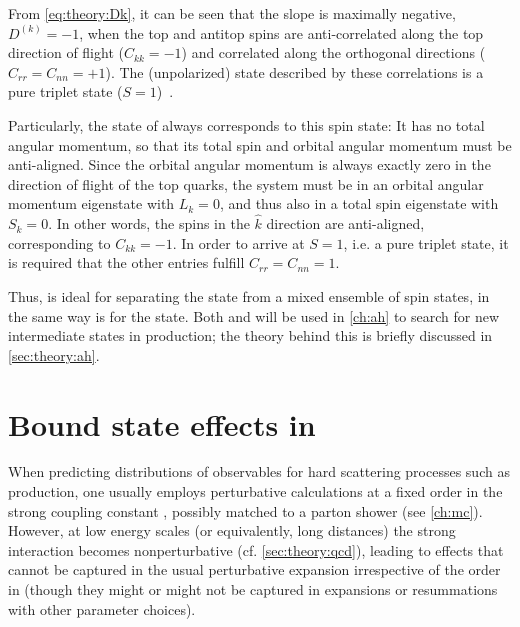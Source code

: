 From \cref{eq:theory:Dk}, it can be seen that the slope is maximally negative, $D^{(k)} = -1$, when the top and antitop spins are anti-correlated along the top direction of flight ($C_{kk} = -1$) and correlated along the orthogonal directions ($C_{rr} = C_{nn} = +1$). The (unpolarized) state described by these correlations is a pure triplet state ($S=1$)~\cite{Maltoni:2024tul}. 

Particularly, the  state of \ttbar always corresponds to this spin state: It has no total angular momentum, so that its total spin and orbital angular momentum must be anti-aligned. Since the orbital angular momentum is always exactly zero in the direction of flight of the top quarks, the \ttbar system must be in an orbital angular momentum eigenstate with $L_k = 0$, and thus also in a total spin eigenstate with $S_k = 0$. In other words, the spins in the $\hat{k}$ direction are anti-aligned, corresponding to $C_{kk} = -1$. In order to arrive at $S=1$, i.e. a pure triplet state, it is required that the other entries fulfill $C_{rr} = C_{nn} = 1$.

Thus, \chan is ideal for separating the  state from a mixed ensemble of \ttbar spin states, in the same way \chel is for the  state. Both \chel and \chan will be used in \cref{ch:ah} to search for new intermediate states in \ttbar production; the theory behind this is briefly discussed in \cref{sec:theory:ah}.



\section{Bound state effects in \ttbartitle}
\label{sec:theory:etat}

When predicting distributions of observables for hard scattering processes such as \ttbar production, one usually employs perturbative calculations at a fixed order in the strong coupling constant \alphas, possibly matched to a parton shower (see \cref{ch:mc}). However, at low energy scales (or equivalently, long distances) the strong interaction becomes nonperturbative (cf. \cref{sec:theory:qcd}), leading to effects that cannot be captured in the usual perturbative expansion irrespective of the order in \alphas (though they might or might not be captured in expansions or resummations with other parameter choices).

